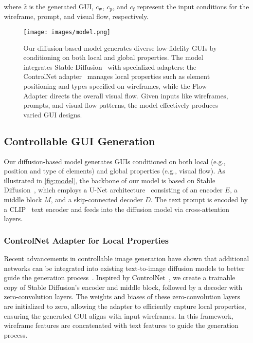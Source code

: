 where $\hat{z}$ is the generated GUI, $c_\mathrm{w}$, $c_\mathrm{p}$, and $c_\mathrm{f}$ represent the input conditions for the wireframe, prompt, and visual flow, respectively.



\begin{figure}
    \centering
    \texttt{[image: images/model.png]}
    \caption{
Our diffusion-based model generates diverse low-fidelity GUIs by conditioning on both local and global properties. The model integrates Stable Diffusion~\cite{rombach2022high} with specialized adapters: the ControlNet adapter~\cite{controlnet} manages local properties such as element positioning and types specified on wireframes, while the Flow Adapter directs the overall visual flow. Given inputs like wireframes, prompts, and visual flow patterns, the model effectively produces varied GUI designs.
    }
    \label{fig:model}
\end{figure}

\subsection{Controllable GUI Generation}

Our diffusion-based model generates GUIs conditioned on both local (e.g., position and type of elements) and global properties (e.g., visual flow). As illustrated in \autoref{fig:model}, the backbone of our model is based on Stable Diffusion~\cite{rombach2022high}, which employs a U-Net architecture~\cite{ronneberger2015u} consisting of an encoder $E$, a middle block $M$, and a skip-connected decoder $D$. The text prompt is encoded by a CLIP~\cite{clip} text encoder and feeds into the diffusion model via cross-attention layers.



\subsubsection{ControlNet Adapter for Local Properties}


Recent advancements in controllable image generation have shown that additional networks can be integrated into existing text-to-image diffusion models to better guide the generation process~\cite{controlnet, controlnet_plus_plus, mou2024t2i}. Inspired by ControlNet~\cite{controlnet}, we create a trainable copy of Stable Diffusion's encoder and middle block, followed by a decoder with zero-convolution layers. The weights and biases of these zero-convolution layers are initialized to zero, allowing the adapter to efficiently capture local properties, ensuring the generated GUI aligns with input wireframes. In this framework, wireframe features are concatenated with text features to guide the generation process.


